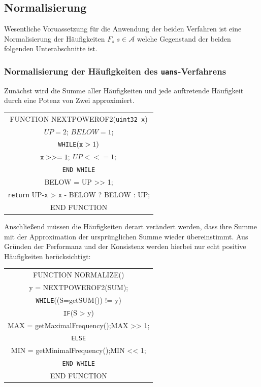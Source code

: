 \documentclass[a4paper,12pt]{article}
\newcommand{\A}{\mathcal A}
\begin{document}
\subsection{Normalisierung}
Wesentliche Voruassetzung für die Anwendung der beiden Verfahren ist eine Normalisierung der Häufigkeiten $F_{s}\;s\in\A$ welche Gegenstand der beiden folgenden Unterabschnitte ist.

\subsubsection{Normalisierung der Häufigkeiten des {\tt{uans}}-Verfahrens}

Zunächst wird die Summe aller Häufigkeiten und jede auftretende Häufigkeit durch eine Potenz von Zwei approximiert.
\par

\begin{center}
\begin{tabular}{c}
FUNCTION NEXTPOWEROF2({\tt{uint32 x}}) 
\\
$UP=2$; $BELOW=1$; 
\\
{\tt{WHILE}}$({\tt{x}} > 1)$ 
\\
${\tt{x}} >>= 1;$ $UP <<= 1;$
\\
{\tt{END {\tt{WHILE}}}}
\\
BELOW = UP >> 1;  
\\
{\tt{return}} UP-{\tt{x}} > {\tt{x}} - BELOW ? BELOW : UP;
\\
END FUNCTION
\end{tabular} 
\end{center}

Anschließend müssen die Häufigkeiten derart verändert werden, dass ihre Summe mit der Approximation der ursprünglichen Summe wieder übereinstimmt. Aus Gründen der Performanz und der Konsistenz werden hierbei nur echt positive Häufigkeiten berücksichtigt:

\begin{center}
\begin{tabular}{c}
FUNCTION NORMALIZE() 
\\
y = NEXTPOWEROF2(SUM); 
\\
{\tt{WHILE}}((S=getSUM()) != y) 
\\
{\tt{IF}}(S > y)
\\
MAX = getMaximalFrequency();MAX >> 1;
\\
{\tt{ELSE}}
\\
MIN = getMinimalFrequency();MIN << 1;
\\
{\tt{END WHILE}}
\\
END FUNCTION
\end{tabular} 
\end{center}
\end{document}
